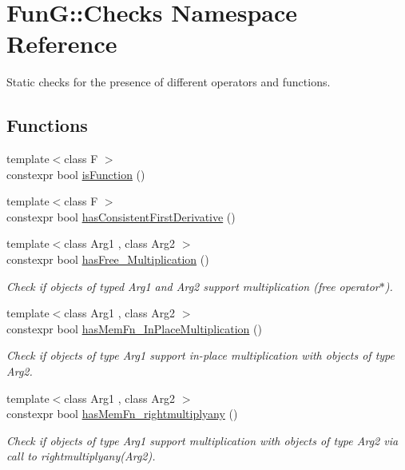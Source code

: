 \hypertarget{namespaceFunG_1_1Checks}{}\section{Fun\+G\+:\+:Checks Namespace Reference}
\label{namespaceFunG_1_1Checks}


Static checks for the presence of different operators and functions.  


\subsection*{Functions}
\begin{DoxyCompactItemize}
\item 
{\footnotesize template$<$class F $>$ }\\constexpr bool \hyperlink{group__Checks_gac6e6c5574a8497cc0749e5a613e4d57c}{is\+Function} ()
\item 
{\footnotesize template$<$class F $>$ }\\constexpr bool \hyperlink{group__Checks_ga5f9a3a474205df6f565dd1a03ebb5e28}{has\+Consistent\+First\+Derivative} ()
\item 
{\footnotesize template$<$class Arg1 , class Arg2 $>$ }\\constexpr bool \hyperlink{group__Checks_ga81302dfb773e50401ec899c3b9a53c4c}{has\+Free\+\_\+\+Multiplication} ()
\begin{DoxyCompactList}\small\item\em Check if objects of typed Arg1 and Arg2 support multiplication (free operator$\ast$). \end{DoxyCompactList}\item 
{\footnotesize template$<$class Arg1 , class Arg2 $>$ }\\constexpr bool \hyperlink{group__Checks_ga1fb52331af88ccf29e380c8e5597e801}{has\+Mem\+Fn\+\_\+\+In\+Place\+Multiplication} ()
\begin{DoxyCompactList}\small\item\em Check if objects of type Arg1 support in-\/place multiplication with objects of type Arg2. \end{DoxyCompactList}\item 
{\footnotesize template$<$class Arg1 , class Arg2 $>$ }\\constexpr bool \hyperlink{group__Checks_ga88d1f93f87cf5f51d426fcfee862d6f6}{has\+Mem\+Fn\+\_\+rightmultiplyany} ()
\begin{DoxyCompactList}\small\item\em Check if objects of type Arg1 support multiplication with objects of type Arg2 via call to rightmultiplyany(\+Arg2). \end{DoxyCompactList}\item 

\end{DoxyCompactItemize}
